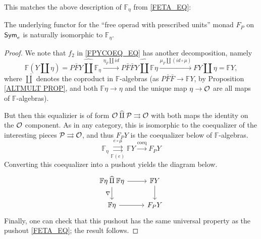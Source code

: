 \documentclass[a4paper,10pt
,draft
]{article}%
\renewcommand{\1}{\eta}%
\begin{document}
This matches the above description of $\mathbb F_\eta$ from \eqref{FETA_EQ}:
\begin{lemma}
      The underlying functor for the ``free operad with prescribed units'' monad $F_P$ on $\mathsf{Sym}_e$ is naturally isomorphic to $\mathbb F_\eta$.
\end{lemma}
\begin{proof}
      We note that $f_2$ in \eqref{FPYCOEQ_EQ} has another decomposition, namely
      \[
            \mathbb F (Y \amalg \eta) = P\bar F Y \mathbin{\hat{\amalg}} \mathbb F_\eta \xrightarrow{\eta_{\bar F} \amalg id}
            P\bar F \bar F Y \mathbin{\hat{\amalg}} \mathbb F \eta \xrightarrow{\mu_{\bar F} \amalg (id \circ \mu)}
            F Y \amalg \eta = \mathbb F Y,
      \]
      where $\hat{\amalg}$ denotes the coproduct in $\mathbb F$-algebras
      (as $P \bar F \bar F \to \mathbb F Y$, by Proposition \ref{ALTMULT PROP}, and both $\mathbb F \eta \to \eta$ and the unique map $\eta \to \mathcal{O}$ are all maps of $\mathbb F$-algebras).

      But then this equalizier is of form
      $
      \mathcal{O} \mathbin{\widehat{\amalg}} \mathcal{P} \rightrightarrows \mathcal{O}
      $
      with both maps the identity on the $\mathcal{O}$ component.
      As in any category, this is isomorphic to the coequalizer of the interesting pieces
      $\mathcal{P} \rightrightarrows \mathcal{O}$,
      and thus $F_P Y$ is the coequalizer below of $\mathbb F$-algebras.
      \[
            \mathbb F_\eta \overset{e \circ \mu}{\underset{\mathbb F(e)} \rightrightarrows} \mathbb F Y \xrightarrow{\mathrm{coeq}} F_P Y
      \]
      Converting this coequalizer into a pushout yields the diagram below.
      \[
            \begin{tikzcd}
                  \mathbb F \eta \mathbin{\hat{\amalg}} \mathbb F \eta \arrow[r] \arrow[d, "\nabla"']
                  &
                  \mathbb F Y \arrow[d]
                  \\
                  \mathbb F \eta \arrow[r]
                  &
                  F_P Y
            \end{tikzcd}
      \]
      Finally, one can check that this pushout has the same universal property as the pushout \eqref{FETA_EQ};
      the result follows.
\end{proof}
\end{document}
